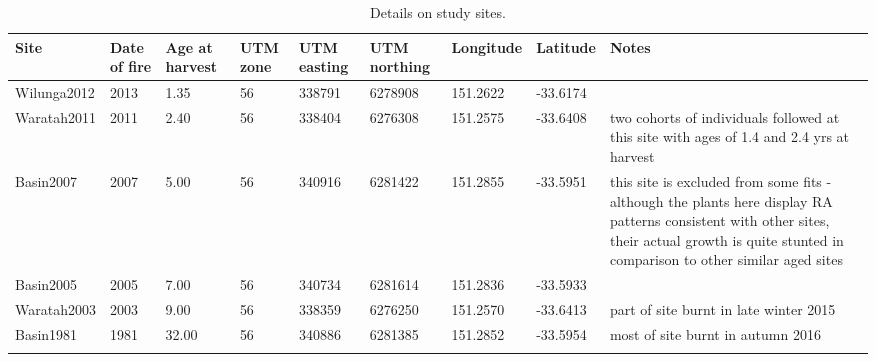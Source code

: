 \documentclass[10pt,twoside]{article}\usepackage[]{graphicx}\usepackage[]{color}
\begin{document}
\endgroup
\begingroup\small
\begin{longtable}{p{2cm}p{1cm}p{1cm}p{1cm}p{1.2cm}p{1.2cm}p{1.2cm}p{1.2cm}p{5cm}}
\caption{Details on study sites.} \\ 
  \hline
Site & Date of fire & Age at harvest & UTM zone & UTM easting & UTM northing & Longitude & Latitude & Notes \\ 
  \hline
Wilunga2012 & 2013 & 1.35 & 56 & 338791 & 6278908 & 151.2622 & -33.6174 &  \\ 
  Waratah2011 & 2011 & 2.40 & 56 & 338404 & 6276308 & 151.2575 & -33.6408 & two cohorts of individuals followed at this site with ages of 1.4 and 2.4 yrs at harvest \\ 
  Basin2007 & 2007 & 5.00 & 56 & 340916 & 6281422 & 151.2855 & -33.5951 & this site is excluded from some fits - although the plants here display RA patterns consistent with other sites, their actual growth is quite stunted in comparison to other similar aged sites \\ 
  Basin2005 & 2005 & 7.00 & 56 & 340734 & 6281614 & 151.2836 & -33.5933 &  \\ 
  Waratah2003 & 2003 & 9.00 & 56 & 338359 & 6276250 & 151.2570 & -33.6413 & part of site burnt in late winter 2015 \\ 
  Basin1981 & 1981 & 32.00 & 56 & 340886 & 6281385 & 151.2852 & -33.5954 & most of site burnt in autumn 2016 \\ 
   \hline
\hline
\label{tab:sites}
\end{longtable}
\endgroup
\end{document}
